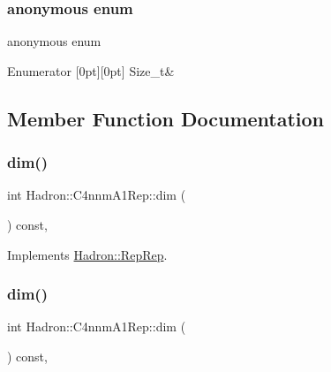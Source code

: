 \subsubsection{\texorpdfstring{anonymous enum}{anonymous enum}}
{\footnotesize\ttfamily anonymous enum}

\begin{DoxyEnumFields}{Enumerator}
[0pt][0pt]{}\mbox{\label{structHadron_1_1C4nnmA1Rep_addf43c6ef164391a43190e386a456132a8ae889b240cb139210b68a0b608a3cfd}} 
Size\+\_\+t&\\
\hline

\end{DoxyEnumFields}


\subsection{Member Function Documentation}
\mbox{\label{structHadron_1_1C4nnmA1Rep_ac851ccfb20da4cca1b97a6279b414442}} 
\subsubsection{\texorpdfstring{dim()}{dim()}\hspace{0.1cm}{\footnotesize\ttfamily [1/5]}}
{\footnotesize\ttfamily int Hadron\+::\+C4nnm\+A1\+Rep\+::dim (\begin{DoxyParamCaption}{ }\end{DoxyParamCaption}) const\hspace{0.3cm}{\ttfamily [inline]}, {\ttfamily [virtual]}}



Implements \mbox{\hyperlink{structHadron_1_1RepRep_a92c8802e5ed7afd7da43ccfd5b7cd92b}{Hadron\+::\+Rep\+Rep}}.

\mbox{\label{structHadron_1_1C4nnmA1Rep_ac851ccfb20da4cca1b97a6279b414442}} 
\subsubsection{\texorpdfstring{dim()}{dim()}\hspace{0.1cm}{\footnotesize\ttfamily [2/5]}}
{\footnotesize\ttfamily int Hadron\+::\+C4nnm\+A1\+Rep\+::dim (\begin{DoxyParamCaption}{ }\end{DoxyParamCaption}) const\hspace{0.3cm}{\ttfamily [inline]}, {\ttfamily [virtual]}}



